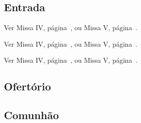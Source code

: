 
\subsection{Entrada}\label{subsection:tempus-per-annum/missa-7/introitus}
\def\AntiphonAnnotation{\CantusID{004473}[Sl 123(122),1]}
\def\AntiphonScore{qui-habitas.8G/}

\begin{rubrica}
  Ver Missa IV, página~\pageref{subsection:tempus-per-annum/missa-4/psalmus-responsorius}, ou Missa V, página~\pageref{subsection:tempus-per-annum/missa-5/psalmus-responsorius}.
\end{rubrica}

\begin{rubrica}
  Ver Missa IV, página~\pageref{subsection:tempus-per-annum/missa-4/alleluia}, ou Missa V, página~\pageref{subsection:tempus-per-annum/missa-5/alleluia}.
\end{rubrica}

\begin{rubrica}
  Ver Missa IV, página~\pageref{subsection:tempus-per-annum/missa-4/psalmus-alleluiaticus}, ou Missa V, página~\pageref{subsection:tempus-per-annum/missa-5/psalmus-alleluiaticus}.
\end{rubrica}

\subsection{Ofertório}\label{subsection:tempus-per-annum/missa-7/offertorium}
\def\AntiphonAnnotation{\CantusID{001587}[Sl 128(127),1]}
\def\AntiphonScore{beati-omnes.2D/}

\AllowPageFlush

\subsection{Comunhão}\label{subsection:tempus-per-annum/missa-7/communio}
\def\AntiphonAnnotation{\CantusID{005214}[Sl 119(118),4]}
\def\AntiphonScore{tu-mandasti-domine.7a/}
